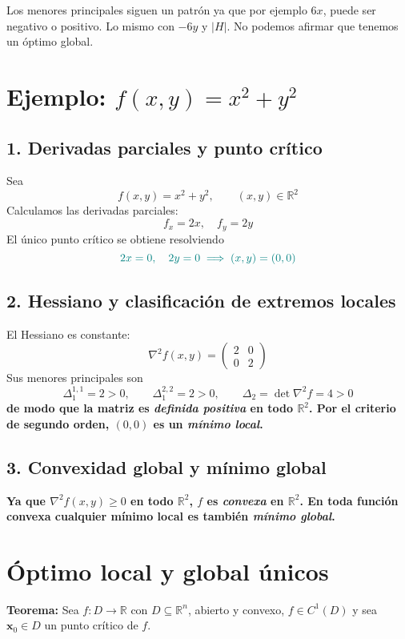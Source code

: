 \documentclass{article}
\newcommand{\R}{\ensuremath{\mathbb{R}}}
\begin{document}
Los menores principales siguen un patrón ya que por ejemplo $6x$, puede ser negativo o positivo. Lo mismo con $-6y$ y $|H|$. No podemos afirmar que tenemos un óptimo global.


\section*{Ejemplo: \(f(x,y)=x^2+y^2\)}

\subsection*{1. Derivadas parciales y punto crítico}

Sea 
\[
f(x,y)=x^2+y^2,\qquad (x,y)\in\R^2
\]
Calculamos las derivadas parciales:
\[
f_x=2x,\quad f_y=2y
\]
El único punto crítico se obtiene resolviendo
\[ \color{teal}
2x=0,\quad 2y=0
\;\Longrightarrow\;
(x,y)=(0,0)
\]

\subsection*{2. Hessiano y clasificación de extremos locales}

El Hessiano es constante:
\[
\nabla^2 f(x,y)
=
\begin{pmatrix}
2 & 0\\[4pt]
0 & 2
\end{pmatrix}
\]
Sus menores principales son
\[
\Delta_1^{1,1}=2>0,\qquad \Delta_1^{2,2}=2>0,\qquad
\Delta_2=\det\nabla^2f=4>0
\]
\textbf{\color{teal}de modo que la matriz es \emph{definida positiva} en todo \(\R^2\). Por el criterio de segundo orden, \((0,0)\) es un \emph{mínimo local}.
}
\subsection*{3. Convexidad global y mínimo global}

\textbf{\color{teal}Ya que \(\nabla^2f(x,y) \geq0\) en todo \(\R^2\), \(f\) es \emph{convexa} en \(\R^2\). En toda función convexa cualquier mínimo local es también \emph{mínimo global}. }

\section*{Óptimo local y global únicos}

\textbf{Teorema:} Sea \( f : D \to \mathbb{R} \) con \( D \subseteq \mathbb{R}^n \), abierto y convexo, \( f \in C^1(D) \) y sea \( \mathbf{x}_0 \in D \) un punto crítico de \( f \).
\end{document}
